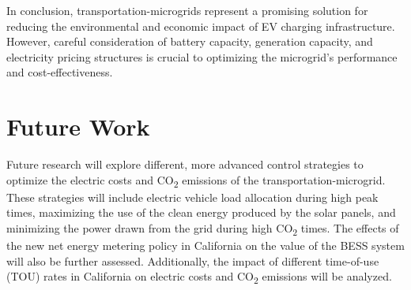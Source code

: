 \documentclass[conference]{IEEEtran}
\begin{document}
	In conclusion, transportation-microgrids represent a promising solution for reducing the environmental and economic impact of EV charging infrastructure. However, careful consideration of battery capacity, generation capacity, and electricity pricing structures is crucial to optimizing the microgrid's performance and cost-effectiveness.
	\section{Future Work}
		  Future research will explore different, more advanced control strategies to optimize the electric costs and CO\textsubscript{2} emissions of the transportation-microgrid. These strategies will include electric vehicle load allocation during high peak times, maximizing the use of the clean energy produced by the solar panels, and minimizing the power drawn from the grid during high CO\textsubscript{2} times. The effects of the new net energy metering policy in California on the value of the BESS system will also be further assessed. Additionally, the impact of different time-of-use (TOU) rates in California on electric costs and CO\textsubscript{2} emissions will be analyzed.


		
		
	
\end{document}
